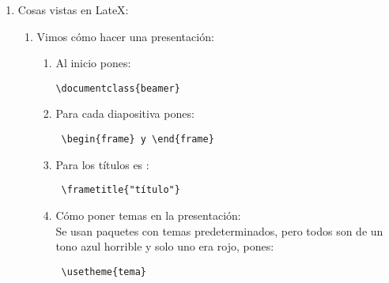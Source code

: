 \documentclass{article} %
\begin{document}
\begin{enumerate}
\begin{enumerate}
	\end{enumerate}
	\item Cosas vistas en LateX:
	\begin{enumerate}
		\item Vimos cómo hacer una presentación:
		\begin{enumerate}
			\item Al inicio pones: 
			\begin{verbatim}\documentclass{beamer} \end{verbatim}
			\item Para cada diapositiva pones: \begin{verbatim} \begin{frame} y \end{frame}\end{verbatim}
			\item Para los títulos es :
			\begin{verbatim} \frametitle{"título"} \end{verbatim}
			\item Cómo poner temas en la presentación:\\ Se usan paquetes con temas predeterminados, pero todos son de un tono azul horrible y solo uno era rojo, pones: \begin{verbatim} \usetheme{tema}
			\end{verbatim}
		\end{enumerate}
	\end{enumerate}
\end{enumerate}
\end{document}
